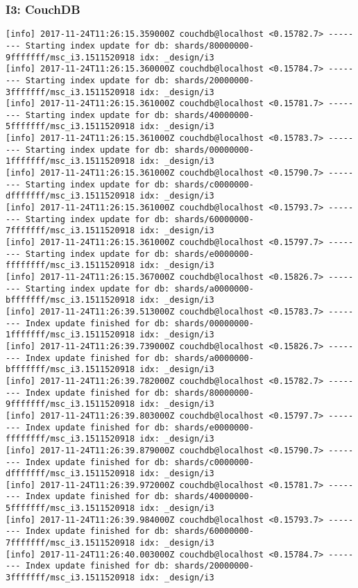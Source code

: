 \subsubsection*{I3: CouchDB}
\begin{verbatim}
[info] 2017-11-24T11:26:15.359000Z couchdb@localhost <0.15782.7> -------- Starting index update for db: shards/80000000-9fffffff/msc_i3.1511520918 idx: _design/i3
[info] 2017-11-24T11:26:15.360000Z couchdb@localhost <0.15784.7> -------- Starting index update for db: shards/20000000-3fffffff/msc_i3.1511520918 idx: _design/i3
[info] 2017-11-24T11:26:15.361000Z couchdb@localhost <0.15781.7> -------- Starting index update for db: shards/40000000-5fffffff/msc_i3.1511520918 idx: _design/i3
[info] 2017-11-24T11:26:15.361000Z couchdb@localhost <0.15783.7> -------- Starting index update for db: shards/00000000-1fffffff/msc_i3.1511520918 idx: _design/i3
[info] 2017-11-24T11:26:15.361000Z couchdb@localhost <0.15790.7> -------- Starting index update for db: shards/c0000000-dfffffff/msc_i3.1511520918 idx: _design/i3
[info] 2017-11-24T11:26:15.361000Z couchdb@localhost <0.15793.7> -------- Starting index update for db: shards/60000000-7fffffff/msc_i3.1511520918 idx: _design/i3
[info] 2017-11-24T11:26:15.361000Z couchdb@localhost <0.15797.7> -------- Starting index update for db: shards/e0000000-ffffffff/msc_i3.1511520918 idx: _design/i3
[info] 2017-11-24T11:26:15.367000Z couchdb@localhost <0.15826.7> -------- Starting index update for db: shards/a0000000-bfffffff/msc_i3.1511520918 idx: _design/i3
[info] 2017-11-24T11:26:39.513000Z couchdb@localhost <0.15783.7> -------- Index update finished for db: shards/00000000-1fffffff/msc_i3.1511520918 idx: _design/i3
[info] 2017-11-24T11:26:39.739000Z couchdb@localhost <0.15826.7> -------- Index update finished for db: shards/a0000000-bfffffff/msc_i3.1511520918 idx: _design/i3
[info] 2017-11-24T11:26:39.782000Z couchdb@localhost <0.15782.7> -------- Index update finished for db: shards/80000000-9fffffff/msc_i3.1511520918 idx: _design/i3
[info] 2017-11-24T11:26:39.803000Z couchdb@localhost <0.15797.7> -------- Index update finished for db: shards/e0000000-ffffffff/msc_i3.1511520918 idx: _design/i3
[info] 2017-11-24T11:26:39.879000Z couchdb@localhost <0.15790.7> -------- Index update finished for db: shards/c0000000-dfffffff/msc_i3.1511520918 idx: _design/i3
[info] 2017-11-24T11:26:39.972000Z couchdb@localhost <0.15781.7> -------- Index update finished for db: shards/40000000-5fffffff/msc_i3.1511520918 idx: _design/i3
[info] 2017-11-24T11:26:39.984000Z couchdb@localhost <0.15793.7> -------- Index update finished for db: shards/60000000-7fffffff/msc_i3.1511520918 idx: _design/i3
[info] 2017-11-24T11:26:40.003000Z couchdb@localhost <0.15784.7> -------- Index update finished for db: shards/20000000-3fffffff/msc_i3.1511520918 idx: _design/i3
\end{verbatim}